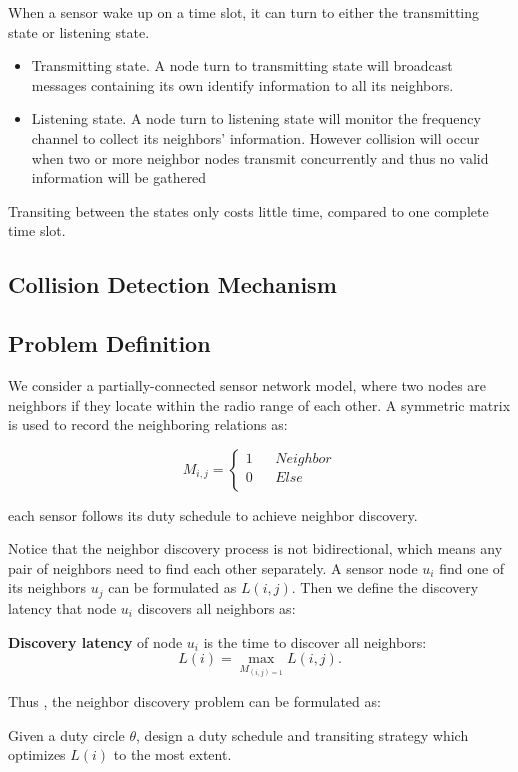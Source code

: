When a sensor wake up on a time slot, it can turn to either the transmitting state or listening state. 
\begin{itemize}
\item Transmitting state. A node turn to transmitting state will broadcast messages containing its own identify 
information to all its neighbors.
\item  Listening state. A node turn to listening state will monitor the frequency channel to collect its neighbors' information.
However collision will occur when two or more neighbor nodes transmit concurrently and thus no valid information will be gathered
\end{itemize}
Transiting between the states only costs little time, compared to one complete time slot.


\subsection{Collision Detection Mechanism}









\subsection{Problem Definition}

We consider a partially-connected sensor network model, 
where two nodes are neighbors if they locate within the radio range of each other. 
A  symmetric matrix is used to record the neighboring relations as:

$$ M_{i,j}=\left\{
\begin{aligned}
1  & & {Neighbor}\\
0  & & {Else}\\
\end{aligned}
\right.
$$

 each sensor follows its duty schedule to achieve neighbor discovery. 


 

Notice that the neighbor discovery process is not bidirectional, which means any pair of neighbors 
need to find each other separately. A sensor node $u_i$ find one of its neighbors $u_j$ can be formulated 
as $L(i,j)$. Then we define the discovery latency that node $u_i$ discovers all neighbors as:

\begin{definition}
\textbf{Discovery latency} of node $u_i$ is the time to discover all neighbors:
$$L(i) = \max_{M_{(i,j) = 1}} L (i,j).
$$
\end{definition}

Thus , the neighbor discovery problem can be formulated as:

\begin{problem}
Given a duty circle $\theta$, design a duty schedule and transiting strategy which optimizes $L(i)$ to the most extent. 
\end{problem}




